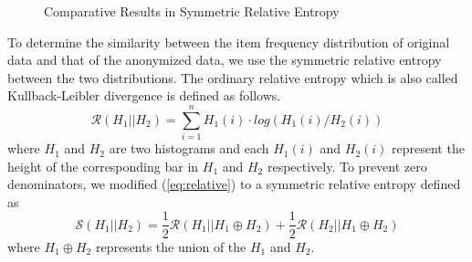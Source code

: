 \begin{figure}[th]
\flushleft
{}
\caption{Comparative Results in Symmetric Relative Entropy}
\label{fig:entropy}
\end{figure}

To determine the similarity between the item frequency distribution
of original data and that of the anonymized data,
we use the symmetric relative entropy between the two distributions.
The ordinary relative entropy
\cite{Lin91divergencemeasures} which is also called Kullback-Leibler
divergence is defined as follows.
\begin{equation} \label{eq:relative}
\mathcal{R}(H_1||H_2)=\sum_{i=1}^{n}H_1(i)\cdot log(H_1(i)/H_2(i))
\end{equation}
where $H_1$ and $H_2$ are two histograms and each $H_1(i)$ and $H_2(i)$ represent the height of the corresponding bar in $H_1$ and $H_2$ respectively.
To prevent zero denominators, we modified (\ref{eq:relative})
to a symmetric relative entropy \cite{Fisher:2008:DSF} defined as
\[\mathcal{S}(H_1||H_2)=\frac{1}{2}\mathcal R( H_1||H_1 \oplus H_2)+\frac{1}{2}\mathcal R( H_2||H_1 \oplus H_2)\]
where  $H_1 \oplus H_2$ represents the union of the $H_1$ and $H_2$.

